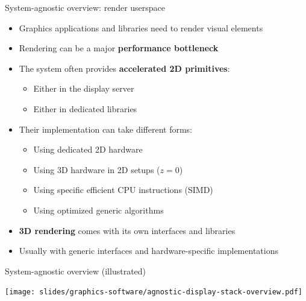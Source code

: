 \begin{frame}{System-agnostic overview: render userspace}
  \begin{itemize}
  \item Graphics applications and libraries need to render visual elements
  \item Rendering can be a major \textbf{performance bottleneck}
  \item The system often provides \textbf{accelerated 2D primitives}:
    \begin{itemize}
    \item Either in the display server
    \item Either in dedicated libraries
    \end{itemize}
  \item Their implementation can take different forms:
    \begin{itemize}
    \item Using dedicated 2D hardware
    \item Using 3D hardware in 2D setups (\(z = 0\))
    \item Using specific efficient CPU instructions (SIMD)
    \item Using optimized generic algorithms
    \end{itemize}
  \item \textbf{3D rendering} comes with its own interfaces and libraries
  \item Usually with generic interfaces and hardware-specific implementations
  \end{itemize}
\end{frame}

\begin{frame}{System-agnostic overview (illustrated)}
  \begin{center}
  \texttt{[image: slides/graphics-software/agnostic-display-stack-overview.pdf]}
  \end{center}
\end{frame}


